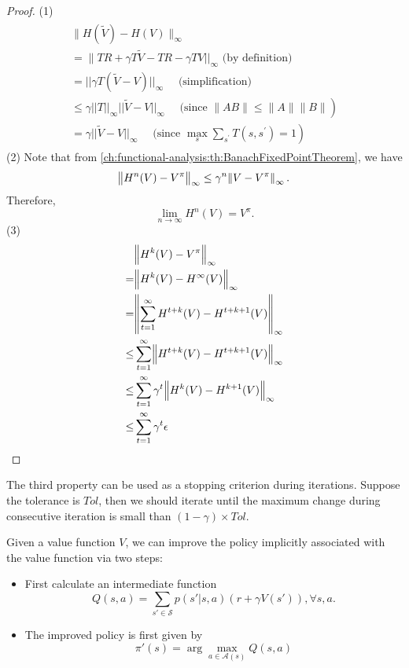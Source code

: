 \begin{refsection}
\begin{theorem}
\end{theorem}
\begin{proof}
(1)
\begin{align*}
\begin{array}{l}{\|H(\tilde{V})-H(V)\|_{\infty}} \\ {=\| TR+\gamma T \tilde{V}-TR-\gamma T V||_{\infty} \text { (by definition) }} \\ {=|| \gamma T(\tilde{V}-V)||_{\infty} \quad \text { (simplification) }} \\ {\left.\leq \gamma|| T||_{\infty}|| \tilde{V}-V||_{\infty} \quad \text { (since }\|A B\| \leq\|A\|\|B\|\right)} \\ {\left.=\gamma|| \tilde{V}-V||_{\infty} \quad \text { (since } \max _{s} \sum_{s^{\prime}} T\left(s, s^{\prime}\right)=1\right)}\end{array}
\end{align*}
(2) 
Note that from \autoref{ch:functional-analysis:th:BanachFixedPointTheorem}, we have 
$$\norm{H^{n}(V) - V^\pi}_\infty \leq \gamma^n \norm{V - V^\pi}_\infty.$$
Therefore, 
$$\lim_{n\to\infty} H^{n}(V) = V^\pi.$$
(3)
\begin{align*}
& \norm{H^k(V) - V^\pi}_\infty \\
=& \norm{H^k(V) - H^\infty(V)}_\infty \\
=& \norm{\sum_{t=1}^\infty H^{t+k}(V) - H^{t+k + 1}(V)}_\infty \\
\leq& \sum_{t=1}^\infty \norm{H^{t+k}(V) - H^{t+k + 1}(V)}_\infty \\
\leq& \sum_{t=1}^\infty \gamma^t \norm{H^{k}(V) - H^{k + 1}(V)}_\infty \\
\leq& \sum_{t=1}^\infty \gamma^t\epsilon
\end{align*}
\end{proof}

\begin{remark}
The third property can be used as a stopping criterion during iterations. Suppose the tolerance is $Tol$, then we should iterate until the maximum change during consecutive iteration is small than $(1 - \gamma)\times Tol$.
\end{remark}



\begin{definition}
Given a value function $V$, we can improve the policy implicitly associated with the value function via two steps:
\begin{itemize}
	\item First calculate an intermediate function
	$$Q(s,a) =  \sum_{s' \in \mathcal{S}}p(s'|s,a)(r+\gamma V(s')), \forall s, a.$$
	\item The improved policy is first given by
	$$\pi'(s) = \arg\max_{a\in\mathcal{A}(s)}Q(s,a)$$
\end{itemize}
\end{definition}




\end{refsection}
